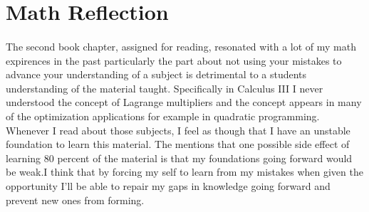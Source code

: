 \documentclass{article}
\begin{document}
  \section*{Math Reflection}
    \paragraph{}
        The  second book chapter, assigned for reading, resonated with a lot of my math expirences in the past particularly the part about not using your mistakes to advance your understanding of a subject is detrimental to a students understanding of the material taught. Specifically in Calculus III I never understood the concept of Lagrange multipliers and the concept appears in many of the optimization applications for example in quadratic programming. Whenever I read about those subjects, I feel as though that I have an unstable foundation to learn this material. The mentions that one possible side effect of learning 80 percent of the material is that my foundations going forward would be weak.I think that by forcing my self to learn from my mistakes when given the opportunity I'll be able to repair my gaps in knowledge going forward and prevent new ones from forming.


    
  
\end{document}
